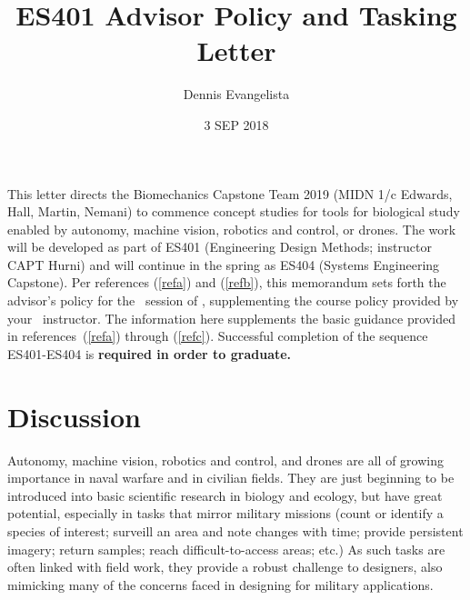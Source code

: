 \documentclass[10pt,courier]{navymemo}
\author{Dennis Evangelista}
\title{ES401 Advisor Policy and Tasking Letter}
\date{3 SEP 2018}
\begin{document}
\makedateblock{}

\MEMORANDUM{}

\begin{navyletterheader}
\navyskip{}%

\navysubjline{}%
\navyskip{}%
\end{navyletterheader}

\section{} This letter directs the Biomechanics Capstone Team 2019 (MIDN 1/c Edwards, Hall, Martin, Nemani) to commence concept studies for tools for biological study enabled by autonomy, machine vision, robotics and control, or drones. The work will be developed as part of ES401 (Engineering Design Methods; instructor CAPT Hurni) and will continue in the spring as ES404 (Systems Engineering Capstone).  Per references (\ref{refa}) and (\ref{refb}), this memorandum sets forth the advisor's policy for the \courseTerm\ session of \usnaCourseNumber, supplementing the course policy provided by your \usnaCourseNumber\ instructor.  The information here supplements the basic guidance provided in references~(\ref{refa}) through (\ref{refc}).  Successful completion of the sequence ES401-ES404 is \textbf{required in order to graduate.}

\section{Discussion} Autonomy, machine vision, robotics and control, and drones are all of growing importance in naval warfare and in civilian fields. They are just beginning to be introduced into basic scientific research in biology and ecology, but have great potential, especially in tasks that mirror military missions (count or identify a species of interest; surveill an area and note changes with time; provide persistent imagery; return samples; reach difficult-to-access areas; etc.) As such tasks are often linked with field work, they provide a robust challenge to designers, also mimicking many of the concerns faced in designing for military applications.
\end{document}

